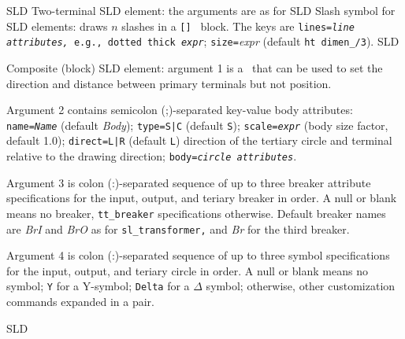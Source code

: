 %
  {SLD}%
  {Two-terminal SLD element: the arguments are as for 
   }%
%
  {SLD}%
  {Slash symbol for SLD elements: draws $n$ slashes in a {\tt [] } block.
   The keys are
   {\tt lines={\sl line attributes,} e.g., dotted thick {\sl expr}};
   {\tt size=}{\sl expr} (default {\tt ht dimen\_/3}).
   }%
%
%
  {SLD}%
  {Composite (block) SLD element: argument 1 is a \linespec\ that can be used
   to set the direction and distance between primary terminals but not
   position.

   Argument 2 contains semicolon (;)-separated key-value body attributes:
   {\tt name={\sl{}Name}} (default {\sl Body});
   {\tt type=S|C} (default {\tt S});
   {\tt scale={\sl expr}} (body size factor, default 1.0);
   {\tt direct=L|R} (default {\tt L}) direction of the tertiary
     circle and terminal relative to the drawing direction;
   {\tt body={\sl circle attributes}}.

   Argument 3 is colon (:)-separated sequence of up to three breaker
   attribute specifications for the input, output, and teriary breaker
   in order.  A null or blank means no breaker, {\tt tt\_breaker}
   specifications otherwise. Default breaker names are {\sl BrI}
   and {\sl BrO} as for
   {\tt sl\_transformer,} and {\sl Br} for the third breaker. 

   Argument 4 is colon (:)-separated sequence of up to three symbol
   specifications for the input, output, and teriary circle
   in order.  A null or blank means no symbol;
   {\tt Y} for a Y-symbol;
   {\tt Delta} for a $\Delta$ symbol;
   otherwise, other customization commands expanded in a {\tt \lbr\rbr} pair.
   }%
%
%
  {SLD}%
